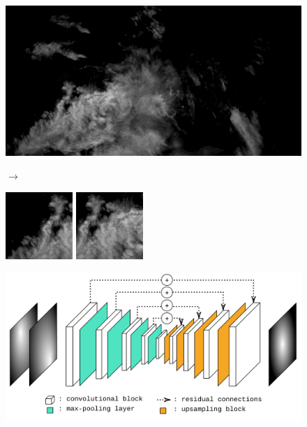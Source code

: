 \documentclass{beamer}
\begin{document}
\begin{frame}{}
	\pause

	\begin{figure}
	    \centering
	    \begin{minipage}{.35\linewidth}
	        \centering
	        \includegraphics[height=0.17\textheight]{fig/04_czrad_gray.png}
	    \end{minipage}%
	    $\rightarrow$
	    \begin{minipage}{0.25\linewidth}
	        \centering
	        \includegraphics[height=0.17\textheight]{fig/crop/34.png}
	    \end{minipage}
	    \begin{minipage}{0.25\linewidth}
	        \centering
	        \includegraphics[height=0.17\textheight]{fig/crop/35.png}
	    \end{minipage}
	\end{figure}
\end{frame}


\begin{frame}{}
	\begin{figure}
		\centering
		\includegraphics[width=\linewidth]{fig/05_cnn_arch.png}
	\end{figure}
\end{frame}
\end{document}
